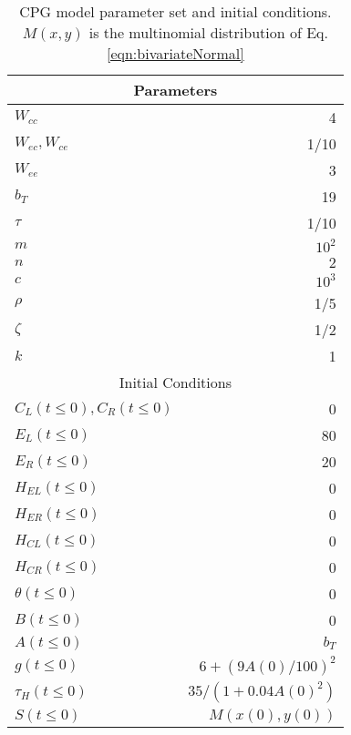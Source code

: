 
\begin{table}[ht!]
 \centering
\begin{tabular}{| l | r |}
 \hline 
\multicolumn{2}{|c|}{Parameters} \\
 \hline 
$W_{cc}$ & 4 \\ \hline
$W_{ec}, W_{ce}$ & 1/10\\ \hline
$W_{ee}$ & 3\\ \hline
$b_T$ & 19 \\ \hline
$\tau$ & 1/10 \\ \hline
$m$ & $10^2$ \\ \hline
$n$ & $2$ \\ \hline
$c$ & $10^3$ \\ \hline
$\rho$ & 1/5 \\ \hline %
$\zeta$ & 1/2 \\  \hline 
$k$ & 1 \\  \hline 
\multicolumn{2}{|c|}{Initial Conditions} \\
 \hline 
$C_L(t \leq 0),C_R(t \leq 0)$ & 0 \\
$E_L(t \leq 0)$ & 80 \\
$E_R(t \leq 0)$ & 20 \\
$H_{EL}(t \leq 0)$ & 0 \\
$H_{ER}(t \leq 0)$ & 0 \\
$H_{CL}(t \leq 0)$ & 0 \\
$H_{CR}(t \leq 0)$ & 0 \\
$\theta(t \leq 0) $ & 0 \\
$B(t \leq 0) $ & 0 \\
$A(t \leq 0) $ & $b_T$ \\
$g(t \leq 0) $ & $6 + (9 A(0)/100)^2$ \\
$\tau_H(t \leq 0) $ & $35 /(1 + 0.04A(0)^2)$ \\ 
$S(t \leq 0) $ & $M(x(0),y(0))$ \\ \hline
\end{tabular}
 \caption{CPG model parameter set and initial conditions. $M(x,y)$ is the multinomial distribution of Eq. \eqref{eqn:bivariateNormal}
\label{tbl:OscparameterSet} }
\end{table}

